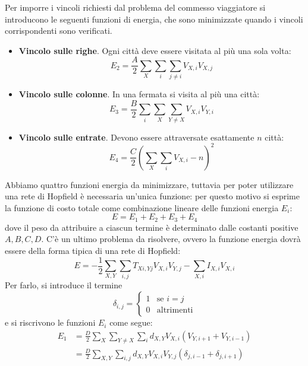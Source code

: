 Per imporre i vincoli richiesti dal problema del commesso viaggiatore si introducono le seguenti funzioni di energia, che sono minimizzate quando i vincoli corrispondenti sono verificati.
\begin{itemize}
	\item \textbf{Vincolo sulle righe}. Ogni città deve essere visitata al più una sola volta:
	\begin{displaymath}
		E_2 = \frac{A}{2} \sum_X \sum_i \sum_{j \neq i} V_{X,i} V_{X,j}
	\end{displaymath}
	\item \textbf{Vincolo sulle colonne}. In una fermata si visita al più una città:
	\begin{displaymath}
		E_3 = \frac{B}{2} \sum_i \sum_X \sum_{Y \neq X} V_{X,i} V_{Y,i}
	\end{displaymath}
	\item \textbf{Vincolo sulle entrate}. Devono essere attraversate esattamente $n$ città:
	\begin{displaymath}
		E_4 = \frac{C}{2}\left(\sum_X \sum_i V_{X,i} - n \right)^2
	\end{displaymath}
\end{itemize}
Abbiamo quattro funzioni energia da minimizzare, tuttavia per poter utilizzare una rete di Hopfield è necessaria un'unica funzione: per questo motivo si esprime la funzione di costo totale come combinazione lineare delle funzioni energia $E_i$:
\begin{displaymath}
	E = E_1 + E_2 + E_3 + E_4
\end{displaymath}
dove il peso da attribuire a ciascun termine è determinato dalle costanti positive $A, B, C, D$. C'è un ultimo problema da risolvere, ovvero la funzione energia dovrà essere della forma tipica di una rete di Hopfield:
\begin{displaymath}
	E = - \frac{1}{2} \sum_{X, Y} \sum_{i, j} T_{Xi, Yj} V_{X, i} V_{Y, j} - \sum_{X, i} I_{X, i} V_{X, i}
\end{displaymath}
Per farlo, si introduce il termine
\begin{displaymath}
	\delta_{i,j} = \begin{cases}
		1 & \text{se } i = j \\
		0 & \text{altrimenti}
	\end{cases}
\end{displaymath}
e si riscrivono le funzioni $E_i$ come segue:
\begin{align*}
	E_1 &= \frac{D}{2} \sum_X \sum_{Y \neq X} \sum_i d_{X,Y} V_{X,i} (V_{Y, i+1} + V_{Y, i-1}) \\
	&=  \frac{D}{2} \sum_{X,Y} \sum_{i,j} d_{X,Y} V_{X,i} V_{Y,j} (\delta_{j, i-1} + \delta_{j, i+1})
\end{align*}

